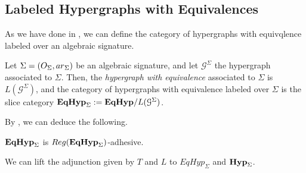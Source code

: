 \subsection{Labeled Hypergraphs with Equivalences}

As we have done in , we can define the category of hypergraphs with equivqlence labeled over an algebraic signature.

\begin{definition}
	Let $\Sigma = (O_\Sigma, \ari_\Sigma)$ be an algebraic signature, and let $\mathcal{G}^{\Sigma}$ the hypergraph associated to $\Sigma$.
	Then, the \emph{hypergraph with equivalence} associated to $\Sigma$ is $L(\mathcal{G}^\Sigma)$, and the category of hypergraphs with equivalence labeled over $\Sigma$ is the 
	slice category $\textbf{\textup{EqHyp}}_\Sigma := \textbf{\textup{EqHyp}}/L(\mathcal{G}^\Sigma)$.
\end{definition}

By , we can deduce the following.

\begin{proposition}
	$\textbf{\textup{EqHyp}}_\Sigma$ is $\reg (\EqHyp_\Sigma)$-adhesive.
\end{proposition}

We can lift the adjunction given by $T$ and $L$ to $EqHyp_\Sigma$ and $\textbf{\textup{Hyp}}_\Sigma$.



